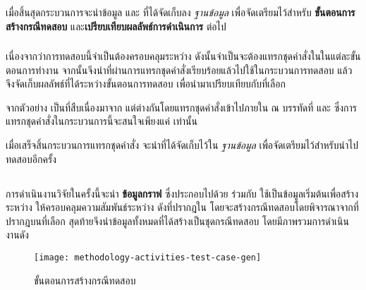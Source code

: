 เมื่อสิ้นสุดกระบวนการจะนำข้อมูล{\bf {\scg}} และ{\bf {\cfg}} ที่ได้จัดเก็บลง {\it ฐานข้อมูล} เพื่อจัดเตรียมไว้สำหรับ 
{\bf ขั้นตอนการสร้างกรณีทดสอบ} และ{\bf เปรียบเทียบผลลัพธ์การดำเนินการ} ต่อไป

\subsubsection{\FirstTimeDefine{\sourcecodeInstrumention}{\sourcecodeInstrumentionEN}}
\label{sec:sub:sub:srcInstrument}

เนื่องจากว่าการทดสอบนี้จำเป็นต้องครอบคลุม{\Path}ระหว่าง{\CUT} ดังนั้นจำเป็นจะต้องแทรกชุดคำสั่งใน{\sourcecode}ในแต่ละขั้นตอนการทำงาน 
จากนั้นจึงนำ{\sourcecode}ที่ผ่านการแทรกชุดคำสั่งเรียบร้อยแล้วไปใช้ในกระบวนการทดสอบ 
แล้วจึงจัดเก็บผลลัพธ์ที่ได้ระหว่างขั้นตอนการทดสอบ เพื่อนำมาเปรียบเทียบกับ{\TestPath}ที่เลือก

\begin{figure}[hbt!]
    \lstset{style=thesiscodestyle}
    
    \caption{{\class} }
    \label{fig:javaBonusScoreInstrumented}
\end{figure}

จากตัวอย่าง เป็น{\sourcecode}ที่สืบเนื่องมาจาก
แต่ต่างกันโดยแทรกชุดคำสั่งเข้าไปภายใน{\sourcecode} ณ บรรทัดที่  และ  ซึ่งการแทรกชุดคำสั่งในกระบวนการนี้จะสนใจเพียงแค่{\CUT} เท่านั้น

เมื่อเสร็จสิ้นกระบวนการแทรกชุดคำสั่ง จะนำ{\sourcecode}ที่ได้จัดเก็บไว้ใน {\it ฐานข้อมูล} เพื่อจัดเตรียมไว้สำหรับนำไปทดสอบอีกครั้ง

\clearpage
\subsection{\FirstTimeDefine{\testcaseGeneration}{\testcaseGenerationEN}}
\label{sec:sub:tcg}

การดำเนินงานวิจัยในครั้งนี้จะนำ {\bf ข้อมูลกราฟ} ซึ่งประกอบไปด้วย {\it {\scg}} ร่วมกับ{\it {\cfg}} ใช้เป็นข้อมูลเริ่มต้นเพื่อสร้าง{\TestPath}
ระหว่าง{\CUT} ให้ครอบคลุมความสัมพันธ์ระหว่าง{\class} ดังที่ปรากฎใน{\scg} โดยจะสร้างกรณีทดสอบโดยพิจารณาจาก{\PredicateNode}ที่ปรากฎบน{\TestPath}ที่เลือก 
สุดท้ายจึงนำข้อมูลทั้งหมดที่ได้สร้างเป็นชุดกรณีทดสอบ โดยมีภาพรวมการดำเนินงานดัง 

\begin{figure}[ht!]
    \centering
    \texttt{[image: methodology-activities-test-case-gen]}
    \caption{ขั้นตอนการสร้างกรณีทดสอบ}
    \label{fig:testcaseGenerationActivity}
\end{figure}

